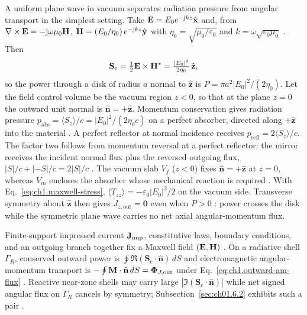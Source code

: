 A uniform plane wave in vacuum separates radiation pressure from angular transport in the simplest setting. Take
$\mathbf{E}=E_0 e^{-\mathrm{j} k z}\hat{\mathbf{x}}$ and, from $\nabla\times\mathbf{E}=-\mathrm{j}\omega\mu_0\mathbf{H}$,
$\mathbf{H}=(E_0/\eta_0)\,e^{-\mathrm{j} k z}\hat{\mathbf{y}}$ with
$\eta_0=\sqrt{\mu_0/\varepsilon_0}$ and $k=\omega\sqrt{\varepsilon_0\mu_0}$
\cite{stratton1941}. Then
\begin{equation}
\label{eq:ch1.intro-plane-wave-preview}
\mathbf{S}_\mathrm{c}=\tfrac12\mathbf{E}\times\mathbf{H}^*=\tfrac{|E_0|^2}{2\eta_0}\,\hat{\mathbf{z}},
\end{equation}
so the power through a disk of radius $a$ normal to $\hat{\mathbf{z}}$ is
$P=\pi a^2 |E_0|^2/(2\eta_0)$. Let the field control volume be the vacuum region
$z<0$, so that at the plane $z=0$ the outward unit normal is $\hat{\mathbf{n}}=+\hat{\mathbf{z}}$.
Momentum conservation gives radiation pressure $p_{\mathrm{abs}}=\langle S_z\rangle/c=
|E_0|^2/(2\eta_0 c)$ on a perfect absorber, directed along $+\hat{\mathbf{z}}$ into the
material \cite{stratton1941}. A perfect reflector at normal incidence receives
$p_{\mathrm{refl}}=2\langle S_z\rangle/c$. The factor two follows from momentum reversal at a perfect reflector: the mirror receives the incident normal flux plus the reversed outgoing flux, $|S|/c+|{-S}|/c=2|S|/c$ \cite{maxwell1873,stratton1941}. The vacuum slab $V_f$ ($z<0$) fixes $\hat{\mathbf{n}}=+\hat{\mathbf{z}}$ at $z=0$, whereas $V_m$ encloses the absorber whose mechanical reaction is required \cite{maxwell1873,stratton1941}. With Eq.~\eqref{eq:ch1.maxwell-stress}, $\langle T_{zz}\rangle=-\varepsilon_0|E_0|^2/2$ on the vacuum side. Transverse symmetry about $\hat{\mathbf{z}}$ then gives $\dot J_{z,\mathrm{out}}=\mathbf{0}$ even when $P>0$ \cite{beth1936}: power crosses the disk while the symmetric plane wave carries no net axial angular-momentum flux.

Finite-support impressed current $\mathbf{J}_{\mathrm{imp}}$, constitutive laws, boundary conditions, and an
outgoing branch together fix a Maxwell field $(\mathbf{E},\mathbf{H})$ \cite{maxwell1873,stratton1941}.
On a radiative shell $\Gamma_R$, conserved outward power is
$\oint \Re(\mathbf{S}_\mathrm{c}\cdot\hat{\mathbf{n}})\,dS$ and electromagnetic
angular-momentum transport is $-\oint \mathbf{M}\cdot\hat{\mathbf{n}}\,dS=\boldsymbol{\Phi}_{J,\mathrm{out}}$
under Eq.~\eqref{eq:ch1.outward-am-flux} \cite{beth1936}. Reactive near-zone shells may
carry large $|\Im(\mathbf{S}_\mathrm{c}\cdot\hat{\mathbf{n}})|$ while net signed angular
flux on $\Gamma_R$ cancels by symmetry; Subsection~\ref{sec:ch01.6.2} exhibits such a pair
\cite{allen1992,chu1948}.

